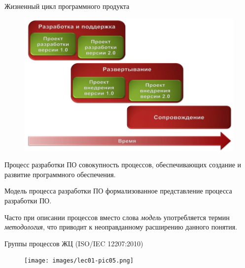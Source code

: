 \documentclass{beamer}
\begin{document}
\begin{frame}
Жизненный цикл программного продукта
\begin{figure}[h]
\centering
\includegraphics[scale=0.5]{images/lec01-pic01.png}
\label{pic-sort}
\end{figure}
\end{frame}

\begin{frame}[t]
\begin{block}{Процесс разработки ПО} 
совокупность процессов, обеспечивающих создание и развитие программного обеспечения. 
\end{block}
\begin{block}{Модель процесса разработки ПО}
формализованное представление процесса разработки ПО.
\end{block}
Часто при описании процессов вместо слова \textit{модель} употребляется термин \textit{методология}, что приводит к неоправданному расширению данного понятия. 
\end{frame}

\begin{frame}
Группы процессов ЖЦ (ISO/IEC 12207:2010)
\begin{figure}[h]
\centering
\texttt{[image: images/lec01-pic05.png]}
\label{pic-sort}
\end{figure}
\end{frame}
\end{document}
